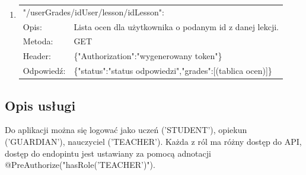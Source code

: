 \documentclass[12pt, titlepage]{article}
\begin{document}
\begin{enumerate}
	\item 
	{\renewcommand{\arraystretch}{1.5}
	\begin{tabular}[t]{p{3cm} p{15cm}}
	\multicolumn{2}{l}{"/userGrades/{idUser}/lesson/{idLesson}":} \\
	Opis: &  Lista ocen dla użytkownika o podanym id z danej lekcji. \\
	Metoda: & GET \\
	Header: & \{"Authorization":"wygenerowany token"\} \\
	Odpowiedź: & \{"status":"status odpowiedzi",\newline "grades":[(tablica ocen)]\}
	\end{tabular}}
\end{enumerate}

\subsection{Opis usługi}

Do aplikacji można się logować jako uczeń ('STUDENT'), opiekun ('GUARDIAN'), nauczyciel ('TEACHER'). Każda z ról ma różny dostęp do API, dostęp do endopintu jest ustawiany za pomocą adnotacji @PreAuthorize("hasRole('TEACHER')").
\end{document}
